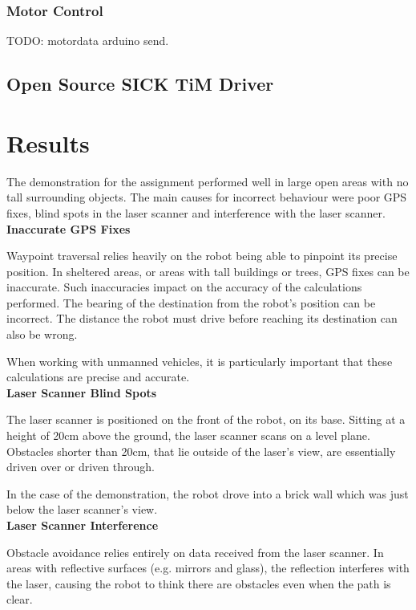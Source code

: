 \documentclass[titlepage,12pt,a4paper]{article}
\begin{document}
\subsubsection{Motor Control}

TODO: motordata arduino send. 

\subsection{Open Source SICK TiM Driver}

\pagebreak
\section{Results}

The demonstration for the assignment performed well in large open areas with no tall surrounding objects. The main causes for incorrect behaviour were poor GPS fixes, blind spots in the laser scanner and interference with the laser scanner. \\

\textbf{Inaccurate GPS Fixes}

Waypoint traversal relies heavily on the robot being able to pinpoint its precise position. In sheltered areas, or areas with tall buildings or trees, GPS fixes can be inaccurate. Such inaccuracies impact on the accuracy of the calculations performed. The bearing of the destination from the robot's position can be incorrect. The distance the robot must drive before reaching its destination can also be wrong. 

When working with unmanned vehicles, it is particularly important that these calculations are precise and accurate. \\

\textbf{Laser Scanner Blind Spots}

The laser scanner is positioned on the front of the robot, on its base. Sitting at a height of 20cm above the ground, the laser scanner scans on a level plane. Obstacles shorter than 20cm, that lie outside of the laser's view, are essentially driven over or driven through. 

In the case of the demonstration, the robot drove into a brick wall which was just below the laser scanner's view. \\

\textbf{Laser Scanner Interference}

Obstacle avoidance relies entirely on data received from the laser scanner. In areas with reflective surfaces (e.g. mirrors and glass), the reflection interferes with the laser, causing the robot to think there are obstacles even when the path is clear.
\end{document}
